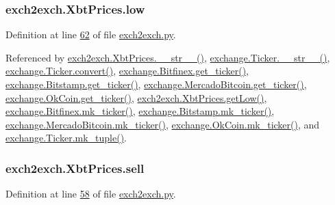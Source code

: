 \subsubsection[{\texorpdfstring{low}{low}}]{\setlength{\rightskip}{0pt plus 5cm}exch2exch.\+Xbt\+Prices.\+low}\hypertarget{classexch2exch_1_1_xbt_prices_a8cef13f833a894d4fc5b8296bb4906fa}{}\label{classexch2exch_1_1_xbt_prices_a8cef13f833a894d4fc5b8296bb4906fa}


Definition at line \hyperlink{exch2exch_8py_source_l00062}{62} of file \hyperlink{exch2exch_8py_source}{exch2exch.\+py}.



Referenced by \hyperlink{exch2exch_8py_source_l00091}{exch2exch.\+Xbt\+Prices.\+\_\+\+\_\+str\+\_\+\+\_\+()}, \hyperlink{exchange_8py_source_l00111}{exchange.\+Ticker.\+\_\+\+\_\+str\+\_\+\+\_\+()}, \hyperlink{exchange_8py_source_l00065}{exchange.\+Ticker.\+convert()}, \hyperlink{exchange_8py_source_l00340}{exchange.\+Bitfinex.\+get\+\_\+ticker()}, \hyperlink{exchange_8py_source_l00409}{exchange.\+Bitstamp.\+get\+\_\+ticker()}, \hyperlink{exchange_8py_source_l00543}{exchange.\+Mercado\+Bitcoin.\+get\+\_\+ticker()}, \hyperlink{exchange_8py_source_l00608}{exchange.\+Ok\+Coin.\+get\+\_\+ticker()}, \hyperlink{exch2exch_8py_source_l00079}{exch2exch.\+Xbt\+Prices.\+get\+Low()}, \hyperlink{exchange_8py_source_l00354}{exchange.\+Bitfinex.\+mk\+\_\+ticker()}, \hyperlink{exchange_8py_source_l00423}{exchange.\+Bitstamp.\+mk\+\_\+ticker()}, \hyperlink{exchange_8py_source_l00557}{exchange.\+Mercado\+Bitcoin.\+mk\+\_\+ticker()}, \hyperlink{exchange_8py_source_l00622}{exchange.\+Ok\+Coin.\+mk\+\_\+ticker()}, and \hyperlink{exchange_8py_source_l00096}{exchange.\+Ticker.\+mk\+\_\+tuple()}.

\subsubsection[{\texorpdfstring{sell}{sell}}]{\setlength{\rightskip}{0pt plus 5cm}exch2exch.\+Xbt\+Prices.\+sell}\hypertarget{classexch2exch_1_1_xbt_prices_a06fd0cfb03d485af3364a0d86fbe5385}{}\label{classexch2exch_1_1_xbt_prices_a06fd0cfb03d485af3364a0d86fbe5385}


Definition at line \hyperlink{exch2exch_8py_source_l00058}{58} of file \hyperlink{exch2exch_8py_source}{exch2exch.\+py}.



